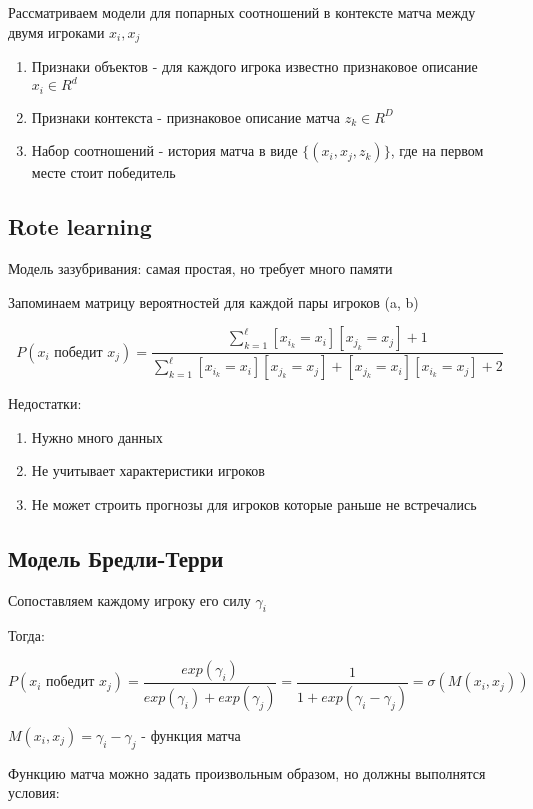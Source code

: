 \documentclass[a4paper, 12pt]{article}
\begin{document}
Рассматриваем модели для попарных соотношений в контексте
матча между двумя игроками $x_i, x_j$

\begin{enumerate}
    \item Признаки объектов - для каждого игрока известно 
    признаковое описание $x_i \in R^d$
    \item Признаки контекста - признаковое описание матча $z_k \in R^D$
    \item Набор соотношений - история матча в виде $\{(x_i, x_j, z_k)\}$,
    где на первом месте стоит победитель
\end{enumerate}

\subsection{Rote learning}

Модель зазубривания: самая простая, но требует много памяти

Запоминаем матрицу вероятностей для каждой пары игроков (a, b)

\[P(x_i\textrm{ победит }x_j) = \frac{\sum_{k = 1}^{\ell} [x_{i_k} = x_i][x_{j_k} = x_j] + 1}
{\sum_{k = 1}^{\ell} [x_{i_k} = x_i][x_{j_k} = x_j] + [x_{j_k} = x_i][x_{i_k} = x_j] + 2}\]

Недостатки:

\begin{enumerate}
    \item Нужно много данных
    \item Не учитывает характеристики игроков
    \item Не может строить прогнозы для игроков которые раньше не встречались
\end{enumerate}

\subsection{Модель Бредли-Терри}

Сопоставляем каждому игроку его силу $\gamma_i$

Тогда:

\[P(x_i\textrm{ победит }x_j) = \frac{exp(\gamma_i)}{exp(\gamma_i) + exp(\gamma_j)}
= \frac{1}{1 + exp(\gamma_i - \gamma_j)} = \sigma(M(x_i, x_j))\]

$M(x_i, x_j) = \gamma_i - \gamma_j$ - функция матча

Функцию матча можно задать произвольным образом, но
должны выполнятся условия:
\end{document}
